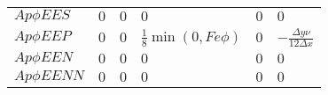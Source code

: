 \begin{center}
\begin{table}[H]
\begin{tabular}{|l|l|l|l|l|l|}
            $Ap\phi EES$  & $0$                     & $0$                     & $0$                                                                                           & $0$                              & $0$                                  \\
            $Ap\phi EEP$  & $0$                     & $0$                     & $\frac{1}{8} \min (0,Fe\phi )$                                                                & $0$                              & $-\frac{\Delta y \nu }{12 \Delta x}$ \\
            $Ap\phi EEN$  & $0$                     & $0$                     & $0$                                                                                           & $0$                              & $0$                                  \\
            $Ap\phi EENN$ & $0$                     & $0$                     & $0$                                                                                           & $0$                              & $0$                                  \\
            \hline
        \end{tabular}
        \label{tab:Ap_coefficients}
    \end{table}
\end{center}

\eject
\restoregeometry
\pdfpagewidth=210mm
\pdfpageheight=297mm